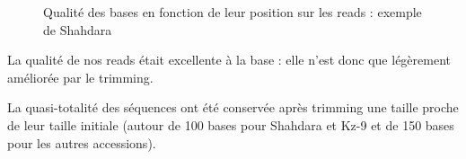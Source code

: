 \documentclass[a4paper]{article}
\begin{document}
\begin{figure}[H]
\centering

 

\label{quality}
\caption{Qualité des bases en fonction de leur position sur les reads : exemple de Shahdara}
\end{figure}

La qualité de nos reads était excellente à la base : elle n'est donc que légèrement améliorée par le trimming. 

La quasi-totalité des séquences ont été conservée après trimming une taille proche de leur taille initiale  (autour de 100 bases pour Shahdara et Kz-9 et de 150 bases pour les autres accessions). 
\end{document}
